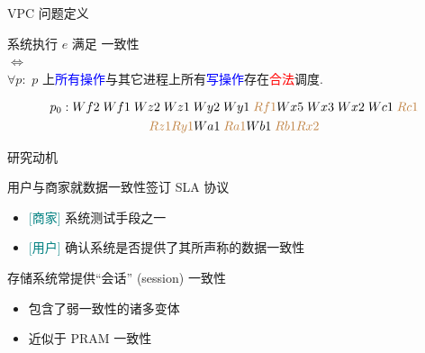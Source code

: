 \begin{frame}{VPC 问题定义}
  \begin{cdef}
	\begin{center}
	  系统执行 $e$ 满足 \PRAM{} 一致性 \\
	  $\iff$\\
	  $\forall p:$ $p$ 上\textcolor{blue}{所有操作}与其它进程上所有\textcolor{blue}{写操作}存在\textcolor{red}{合法}调度.
	\end{center}
  \end{cdef}


  \pause
  \vspace{-0.80cm}

  \begin{gather*}
	p_{0}: Wf2\; Wf1\; Wz2\; Wz1\; Wy2\; Wy1\; \textcolor{brown}{Rf1} 
	Wx5\; Wx3\; Wx2\; Wc1\; \textcolor{brown}{Rc1} \\
	\textcolor{brown}{Rz1} \textcolor{brown}{Ry1}
	Wa1\; \textcolor{brown}{Ra1} Wb1\; \textcolor{brown}{Rb1} \textcolor{brown}{Rx2}
  \end{gather*}
\end{frame}
\begin{frame}{研究动机}
  \vspace{0.10cm}

  \begin{description}
    \setlength{\itemsep}{10pt}
    \item[验证:] 用户与商家就数据一致性签订 SLA 协议 \\
	   
	  \vspace{2pt}
	  \begin{itemize}
		\item \textcolor{teal}{[商家]} 系统测试手段之一
		\item \textcolor{teal}{[用户]} 确认系统是否提供了其所声称的数据一致性 
	  \end{itemize}
	\pause
	\item[PRAM:] 存储系统常提供``会话'' {\small (session)} 一致性\\
       
	  \vspace{2pt}
      \begin{itemize}
		\item 包含了弱一致性的诸多变体 
		\item 近似于 PRAM 一致性  
      \end{itemize}
  \end{description}
\end{frame}
